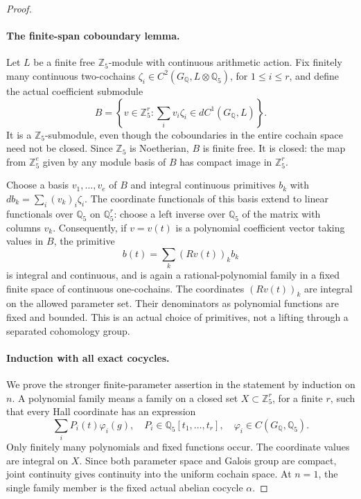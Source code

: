 \begin{proof}
\paragraph{The finite-span coboundary lemma.}
Let \(L\) be a finite free \(\mathbb Z_5\)-module
with continuous arithmetic action. Fix finitely
many continuous two-cochains
\(\zeta_i\in C^2(G_{\mathbb Q},L\otimes\mathbb Q_5)\),
for \(1\le i\le r\), and define the actual
coefficient submodule
\[
 B=\left\{v\in\mathbb Z_5^r:
       \sum_i v_i\zeta_i\in
                 d C^1(G_{\mathbb Q},L)\right\}.
                                                        \tag{D.68.6}
\]
It is a \(\mathbb Z_5\)-submodule, even though
the coboundaries in the entire cochain space
need not be closed. Since \(\mathbb Z_5\) is
Noetherian, \(B\) is finite free. It is closed:
the map from \(\mathbb Z_5^e\) given by any
module basis of \(B\) has compact image in
\(\mathbb Z_5^r\).

Choose a basis \(v_1,\ldots,v_e\) of \(B\)
and integral continuous primitives \(b_k\) with
\(d b_k=\sum_i(v_k)_i\zeta_i\). The coordinate
functionals of this basis extend to linear
functionals over \(\mathbb Q_5\) on
\(\mathbb Q_5^r\): choose a left inverse over
\(\mathbb Q_5\) of the matrix with columns
\(v_k\). Consequently, if \(v=v(t)\) is a
polynomial coefficient vector taking values
in \(B\), the primitive
\[
                b(t)=\sum_k (R v(t))_k b_k
                                                        \tag{D.68.7}
\]
is integral and continuous, and is again a
rational-polynomial family in a fixed finite
space of continuous one-cochains. The coordinates
\((R v(t))_k\) are integral on the allowed
parameter set. Their denominators as polynomial
functions are fixed and bounded. This is an
actual choice of primitives, not a lifting
through a separated cohomology group.

\paragraph{Induction with all exact cocycles.}
We prove the stronger finite-parameter assertion
in the statement by induction on \(n\). A
polynomial family means a family on a closed
set \(X\subset\mathbb Z_5^r\), for a finite
\(r\), such that every Hall coordinate has
an expression
\[
                \sum_i P_i(t)\varphi_i(g),
 \quad P_i\in\mathbb Q_5[t_1,\ldots,t_r],\quad
       \varphi_i\in C(G_{\mathbb Q},\mathbb Q_5).
                                                        \tag{D.68.8}
\]
Only finitely many polynomials and fixed functions
occur. The coordinate values are integral on
\(X\). Since both parameter space and Galois
group are compact, joint continuity gives
continuity into the uniform cochain space.
At \(n=1\), the single family member is the
fixed actual abelian cocycle \(\alpha\).


\end{proof}
